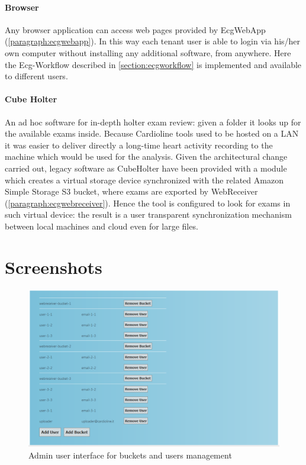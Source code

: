 \paragraph{Browser}
Any browser application can access web pages provided by EcgWebApp (\ref{paragraph:ecgwebapp}). In this way each tenant user is able to login via his/her own computer without installing any additional software, from anywhere.
Here the Ecg-Workflow described in \ref{section:ecgworkflow} is implemented and available to different users.\\
\paragraph{Cube Holter}
An ad hoc software for in-depth holter exam review: given a folder it looks up for the available exams inside.
Because Cardioline tools used to be hosted on a LAN it was easier to deliver directly a long-time heart activity recording to the machine which would be used for the analysis. Given the architectural change carried out, legacy software as CubeHolter have been provided with a module which creates a virtual storage device synchronized with the related Amazon Simple Storage S3 bucket, where exams are exported by WebReceiver (\ref{paragraph:ecgwebreceiver}). Hence the tool is configured to look for exams in such virtual device: the result is a user transparent synchronization mechanism between local machines and cloud even for large files.

\section{Screenshots}

\begin{figure}[h]
    \includegraphics[width=\textwidth]{img/webreceiver_admin_screenshot}
    \caption{Admin user interface for buckets and users management}
    \label{fig:webreceiver_admin_screenshot}
\end{figure}

